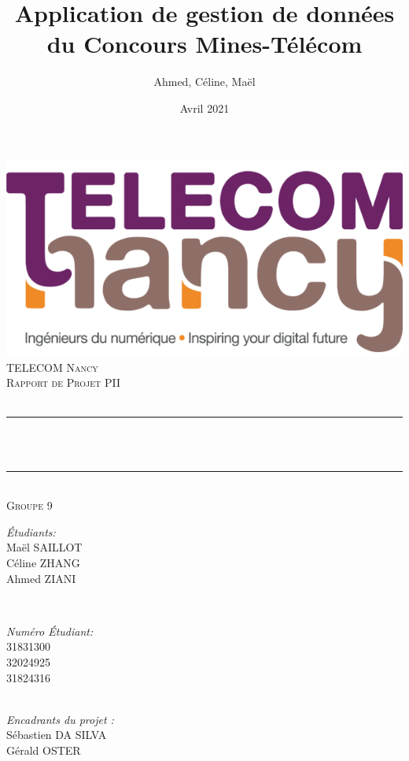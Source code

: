 \documentclass[12pt]{article}
\title{Application de gestion de données du Concours Mines-Télécom}
\author{Ahmed, Céline, Maël}
\date{Avril 2021}
\makeatletter
\let\thetitle\@title
\let\thedate\@date
\makeatother
\begin{document}
\begin{titlepage}
    \centering
    
 	\includegraphics[scale=0.36]{Images/logo/logo_TN_horizontal}\\[1.0 cm]
 	
	\textsc{\LARGE TELECOM Nancy}\\[1.5 cm]
	\textsc{\Large Rapport de Projet PII}\\[0.5 cm]
	{\large \thedate}\\[0.5 cm]
	\rule{\linewidth}{0.2 mm} \\[0.5 cm]
	{ \huge \bfseries \thetitle}\\[0.2 cm]
	\rule{\linewidth}{0.2 mm} \\[1.5 cm]
	\textsc{\large Groupe 9}\\[1.0 cm]
	
	\begin{minipage}{0.4\textwidth}
		\begin{flushleft} \large
		\emph{Étudiants:}\\
			Maël SAILLOT \\
			Céline ZHANG \\
			Ahmed ZIANI
		\end{flushleft}
	\end{minipage}~
	\begin{minipage}{0.4\textwidth}
		\begin{flushright} \large
		\emph{Numéro Étudiant:}\\
			31831300 \\
			32024925 \\
			31824316
		\end{flushright}
	\end{minipage}\\[1.4 cm]
	
	\large
	\emph{Encadrants du projet :}\\
	   Sébastien DA SILVA\\
	   Gérald OSTER\\
	   ~ \\
	   ~ \\[1.5 cm]


\end{titlepage}
\end{document}
